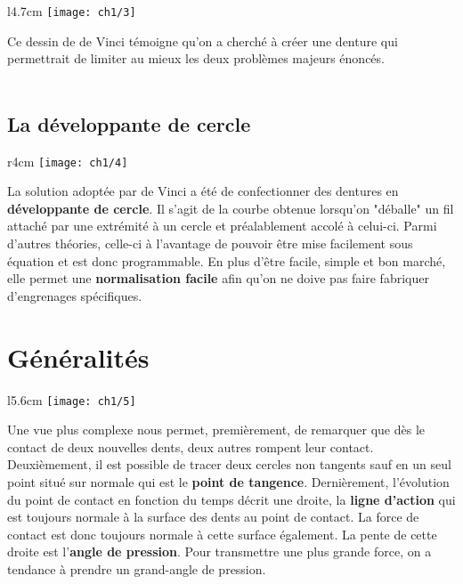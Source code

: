 \begin{wrapfigure}[4]{l}{4.7cm}
	\vspace{-5mm}
	\texttt{[image: ch1/3]}
\end{wrapfigure}	
\noindent Ce dessin de de Vinci témoigne qu'on a cherché à créer une denture qui permettrait de limiter au mieux les deux problèmes majeurs énoncés. \\\\
	
\subsection{La développante de cercle}
\label{subsec:1.2.2}
\begin{wrapfigure}[9]{r}{4cm}
	\vspace{-5mm}
	\texttt{[image: ch1/4]}
\end{wrapfigure}	
\noindent La solution adoptée par de Vinci a été de confectionner des dentures en \textbf{développante de cercle}. Il s'agit de la courbe obtenue lorsqu'on "déballe" un fil attaché par une extrémité à un cercle et préalablement accolé à celui-ci. Parmi d'autres théories, celle-ci à l'avantage de pouvoir être mise facilement sous équation et est donc programmable. En plus d'être facile, simple et bon marché, elle permet une \textbf{normalisation facile} afin qu'on ne doive pas faire fabriquer d'engrenages spécifiques. 
	
\section{Généralités}
\begin{wrapfigure}[8]{l}{5.6cm}
	\vspace{-5mm}
	\texttt{[image: ch1/5]}
\end{wrapfigure}	
\noindent Une vue plus complexe nous permet, premièrement, de remarquer que dès le contact de deux nouvelles dents, deux autres rompent leur contact. Deuxièmement, il est possible de tracer deux cercles non tangents sauf en un seul point situé sur normale qui est le \textbf{point de tangence}. Dernièrement, l'évolution du point de contact en fonction du temps décrit une droite, la \textbf{ligne d'action} qui est toujours normale à la surface des dents au point de contact. La force de contact est donc toujours normale à cette surface également. La pente de cette droite est l'\textbf{angle de pression}. Pour transmettre une plus grande force, on a tendance à prendre un grand-angle de pression. \\
	
